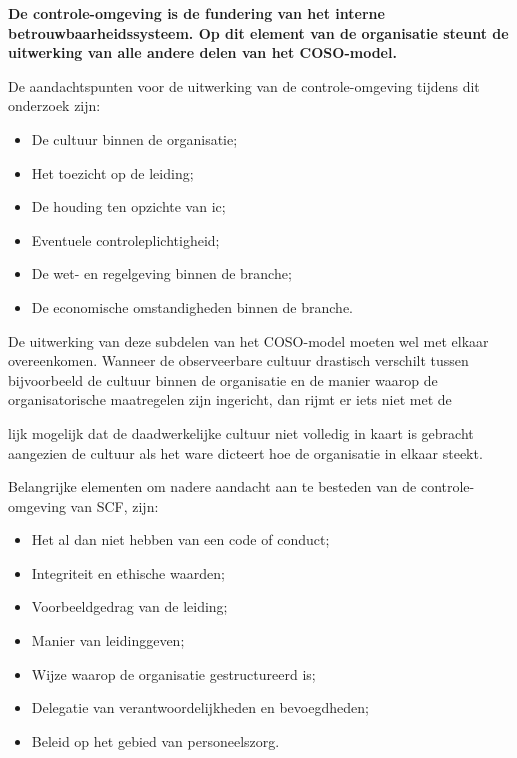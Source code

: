 
\textbf{De controle-omgeving is de fundering van het interne betrouwbaarheidssysteem. Op dit element van de organisatie steunt de uitwerking van alle andere delen van het COSO-model.}

\medskip
\noindent
De aandachtspunten voor de uitwerking van de controle-omgeving tijdens dit onderzoek zijn: 

\begin{itemize}
    \item De cultuur binnen de organisatie;
    \item Het toezicht op de leiding;
    \item De houding ten opzichte van \gls{ic};
    \item Eventuele controleplichtigheid;
    \item De wet- en regelgeving binnen de branche;
    \item De economische omstandigheden binnen de branche.
\end{itemize}

De uitwerking van deze subdelen van het COSO-model moeten wel met elkaar overeenkomen. Wanneer de observeerbare cultuur drastisch verschilt tussen bijvoorbeeld de cultuur binnen de organisatie en de manier waarop de organisatorische maatregelen zijn ingericht, dan rijmt er iets niet met de 

\begin{center}
\end{center}

\noindent
lijk mogelijk dat de daadwerkelijke cultuur niet volledig in kaart is gebracht aangezien de cultuur als het ware dicteert hoe de organisatie in elkaar steekt. \citep{bivperspectief,bivpraktijk}


\bigskip
\noindent
Belangrijke elementen om nadere aandacht aan te besteden van de controle-omgeving van SCF, zijn: \\
\begin{itemize}
    \item Het al dan niet hebben van een code of conduct;
    \item Integriteit en ethische waarden;
    \item Voorbeeldgedrag van de leiding;
    \item Manier van leidinggeven;
    \item Wijze waarop de organisatie gestructureerd is;
    \item Delegatie van verantwoordelijkheden en bevoegdheden;
    \item Beleid op het gebied van personeelszorg.
\end{itemize}

